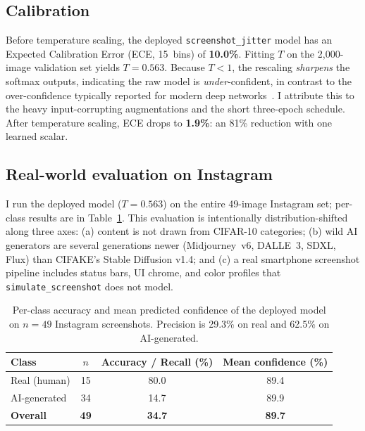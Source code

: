 \documentclass{article}
\begin{document}
\subsection{Calibration}
\label{sec:calib}
Before temperature scaling, the deployed
\texttt{screenshot\_jitter} model has an Expected Calibration Error
(ECE, 15~bins) of \textbf{10.0\%}. Fitting $T$ on the 2{,}000-image
validation set yields $T = 0.563$. Because $T < 1$, the rescaling
\emph{sharpens} the softmax outputs, indicating the raw model is
\emph{under}-confident, in contrast to the over-confidence typically
reported for modern deep networks~\citep{guo2017calibration}. I
attribute this to the heavy input-corrupting augmentations and the
short three-epoch schedule. After temperature scaling, ECE drops to
\textbf{1.9\%}: an 81\% reduction with one learned scalar.

\subsection{Real-world evaluation on Instagram}
\label{sec:realworld}

I run the deployed model ($T=0.563$) on the entire 49-image
Instagram set; per-class results are in Table~\ref{tab:realworld}.
This evaluation is intentionally distribution-shifted along three
axes: (a) content is not drawn from CIFAR-10 categories; (b) wild
AI generators are several generations newer (Midjourney~v6,
DALL\textperiodcentered E~3, SDXL, Flux) than CIFAKE's Stable
Diffusion v1.4; and (c) a real smartphone screenshot pipeline
includes status bars, UI chrome, and color profiles that
\texttt{simulate\_screenshot} does not model.

\begin{table}[t]
\centering
\begin{tabular}{lccc}
\toprule
Class           & $n$  & Accuracy / Recall (\%) & Mean confidence (\%) \\
\midrule
Real (human)    & 15   & 80.0                   & 89.4                 \\
AI-generated    & 34   & 14.7                   & 89.9                 \\
\midrule
\textbf{Overall}& \textbf{49}  & \textbf{34.7}  & \textbf{89.7}        \\
\bottomrule
\end{tabular}
\caption{Per-class accuracy and mean predicted confidence of the
deployed model on $n=49$ Instagram screenshots. Precision is 29.3\%
on real and 62.5\% on AI-generated.}
\label{tab:realworld}
\end{table}
\end{document}
